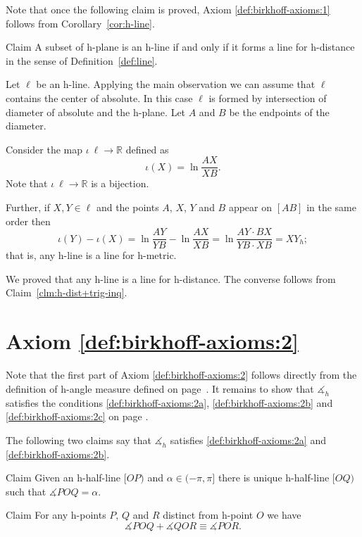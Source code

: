 Note that once the following claim is proved,
Axiom \ref{def:birkhoff-axioms:1} 
follows from Corollary~\ref{cor:h-line}.

\begin{thm}{Claim}
A subset of h-plane is an h-line if and only if it forms a line for h-distance in the sense of Definition~\ref{def:line}.
\end{thm}

Let $\ell$ be an h-line.
Applying the main observation we can assume that $\ell$ contains the center of absolute.
In this case $\ell$ is formed by intersection of diameter of absolute and the h-plane.
Let $A$ and $B$ be the endpoints of the diameter.

Consider the map $\iota\:\ell\to \mathbb{R}$ defined as
$$\iota(X)=\ln \frac{AX}{XB}.$$
Note that $\iota\:\ell\to \mathbb{R}$ is a bijection.

Further, if $X,Y\in \ell$ and the points $A$, $X$, $Y$ and $B$ appear on $[AB]$ in the same order then
\[\iota(Y)-\iota(X)=\ln \frac{AY}{YB}-\ln \frac{AX}{XB}=\ln \frac{AY\cdot BX}{YB\cdot XB}=XY_h;\]
that is, any h-line is a line for h-metric.

We proved that any h-line is a line for h-distance.
The converse follows from Claim~\ref{clm:h-dist+trig-inq}.
\qeds


\section*{Axiom \ref{def:birkhoff-axioms:2}}

Note that the first part of Axiom \ref{def:birkhoff-axioms:2} follows directly from the definition of h-angle measure defined on page~\pageref{h-angle measure}.
It remains to show that $\measuredangle_h$ satisfies the conditions \ref{def:birkhoff-axioms:2a}, \ref{def:birkhoff-axioms:2b} and \ref{def:birkhoff-axioms:2c} on page \pageref{def:birkhoff-axioms:2b}.

The following two claims say that
$\measuredangle_h$ satisfies
 \ref{def:birkhoff-axioms:2a} and \ref{def:birkhoff-axioms:2b}.

\begin{thm}{Claim}\label{clm:h2a}
Given an h-half-line $[O P)$ and $\alpha\in(-\pi,\pi]$ there is unique  h-half-line $[O Q)$ such that $\measuredangle P O Q= \alpha$.
\end{thm}

\begin{thm}{Claim}\label{clm:h2b}
For any h-points $P$, $Q$ and $R$ distinct from h-point $O$ we have
$$\measuredangle P O Q+\measuredangle Q O R
\equiv\measuredangle P O R.$$

\end{thm}

